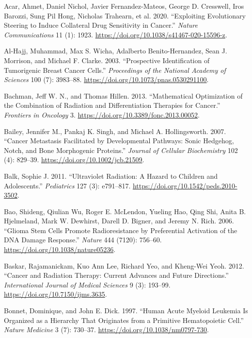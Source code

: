 \documentclass[
  letterpaper,
]{scrreprt}
\newlength{\cslhangindent}
\newenvironment{CSLReferences}[2] %
 {\begin{list}{}{%
  \setlength{\itemindent}{0pt}
  \setlength{\leftmargin}{0pt}
  \setlength{\parsep}{0pt}
  \ifodd #1
   \setlength{\leftmargin}{\cslhangindent}
   \setlength{\itemindent}{-1\cslhangindent}
  \fi
  \setlength{\itemsep}{#2\baselineskip}}}
 {\end{list}}
\theoremstyle{definition}
\theoremstyle{remark}
\begin{document}
\label{refs}
\begin{CSLReferences}{1}{0}
Acar, Ahmet, Daniel Nichol, Javier Fernandez-Mateos, George D.
Cresswell, Iros Barozzi, Sung Pil Hong, Nicholas Trahearn, et al. 2020.
{``Exploiting Evolutionary Steering to Induce Collateral Drug
Sensitivity in Cancer.''} \emph{Nature Communications} 11 (1): 1923.
\url{https://doi.org/10.1038/s41467-020-15596-z}.

Al-Hajj, Muhammad, Max S. Wicha, Adalberto Benito-Hernandez, Sean J.
Morrison, and Michael F. Clarke. 2003. {``Prospective Identification of
Tumorigenic Breast Cancer Cells.''} \emph{Proceedings of the National
Academy of Sciences} 100 (7): 3983--88.
\url{https://doi.org/10.1073/pnas.0530291100}.

Bachman, Jeff W. N., and Thomas Hillen. 2013. {``Mathematical
Optimization of the Combination of Radiation and Differentiation
Therapies for Cancer.''} \emph{Frontiers in Oncology} 3.
\url{https://doi.org/10.3389/fonc.2013.00052}.

Bailey, Jennifer M., Pankaj K. Singh, and Michael A. Hollingsworth.
2007. {``Cancer Metastasis Facilitated by Developmental Pathways: Sonic
Hedgehog, Notch, and Bone Morphogenic Proteins.''} \emph{Journal of
Cellular Biochemistry} 102 (4): 829--39.
\url{https://doi.org/10.1002/jcb.21509}.

Balk, Sophie J. 2011. {``Ultraviolet Radiation: A Hazard to Children and
Adolescents.''} \emph{Pediatrics} 127 (3): e791--817.
\url{https://doi.org/10.1542/peds.2010-3502}.

Bao, Shideng, Qiulian Wu, Roger E. McLendon, Yueling Hao, Qing Shi,
Anita B. Hjelmeland, Mark W. Dewhirst, Darell D. Bigner, and Jeremy N.
Rich. 2006. {``Glioma Stem Cells Promote Radioresistance by Preferential
Activation of the DNA Damage Response.''} \emph{Nature} 444 (7120):
756--60. \url{https://doi.org/10.1038/nature05236}.

Baskar, Rajamanickam, Kuo Ann Lee, Richard Yeo, and Kheng-Wei Yeoh.
2012. {``Cancer and Radiation Therapy: Current Advances and Future
Directions.''} \emph{International Journal of Medical Sciences} 9 (3):
193--99. \url{https://doi.org/10.7150/ijms.3635}.

Bonnet, Dominique, and John E. Dick. 1997. {``Human Acute Myeloid
Leukemia Is Organized as a Hierarchy That Originates from a Primitive
Hematopoietic Cell.''} \emph{Nature Medicine} 3 (7): 730--37.
\url{https://doi.org/10.1038/nm0797-730}.


\end{CSLReferences}
\end{document}

